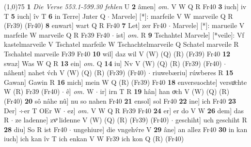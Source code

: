 \documentclass[8pt,a4paper,notitlepage]{article}
\begin{document}
\begin{table}[ht]
\begin{minipage}[t]{0.5\linewidth}
\line(1,0){75} \newline
\textbf{1} \textit{Die Verse 553.1-599.30 fehlen} U  \textbf{2} âmen] \textit{om.} V W Q R Fr40 \textbf{3} iuch] iv T \textbf{5} iuch] îv T \textbf{6} in Terre] Jnter Q  $\cdot$ Marvele] [*]: marfeile V W marveile Q R (Fr39) (Fr40) \textbf{8} enwart] wart Q R Fr40 \textbf{7} Let] zer Fr40  $\cdot$ Marvele] [*]:  marueile V marfeile W marveile Q R Fr39 Fr40  $\cdot$ ist] \textit{om.} R \textbf{9} Tschahtel Marvele] [*veile]: Vf kastelmarveile V Tschatel marfeile W Tschachtelmarveile Q Schatel marveile R Tschahtel marveile Fr39 Fr40 \textbf{10} wil] daz wil V (W) (Q) (R) (Fr39) Fr40 \textbf{12} swaz] Was W Q R \textbf{13} ein] \textit{om.} Q \textbf{14} iu] Nv V (W) (Q) (R) (Fr39) (Fr40)  $\cdot$ nâhent] nahet v́ch V (W) (Q) (R) (Fr39) (Fr40)  $\cdot$ riuwebæriu] rúwberes R \textbf{15} Gawan] Gawin R \textbf{16} mich] mein W Q (R) (Fr39) Fr40 \textbf{18} enversuochte] versuͦchte W (R) Fr39 (Fr40)  $\cdot$ ê] \textit{om.} W  $\cdot$ ir] irn T R \textbf{19} hân] han oͮch V (W) (Q) (R) (Fr40) \textbf{20} sô nâhe nû] nu so nahen Fr40 \textbf{21} ensol] sol Fr40 \textbf{22} ine] ich Fr40 \textbf{23} Der] ÷er T OEr W  $\cdot$ ez] \textit{om.} V W Q R Fr39 Fr40 \textbf{24} er] er do V W \textbf{26} dem] das R  $\cdot$ ze ladenne] zvͦ lidenne V (W) (Q) (R) (Fr39) (Fr40)  $\cdot$ geschiht] uch geschiht R \textbf{28} diu] So R ist Fr40  $\cdot$ ungehiure] die vngehv́re V \textbf{29} âne] an allez Fr40 \textbf{30} in kan iuch] ich kan îv T ich enkan V W Fr39 ich kon Q (R) (Fr40) \newline
\end{minipage}
\end{table}
\end{document}
